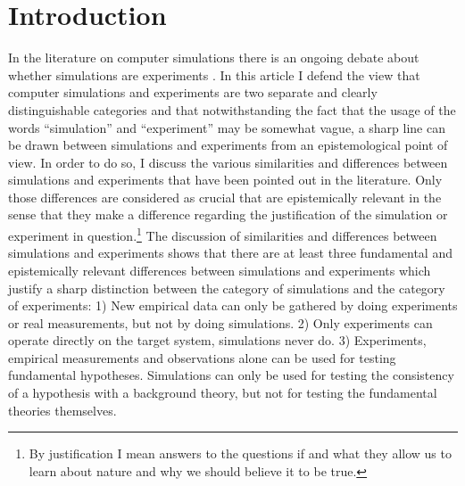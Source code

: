 \documentclass[onecollarge]{STJour}
\numberwithin{equation}{section}
\begin{document}
\tableofcontents

\onehalfspacing

\section{Introduction}



In the literature on computer simulations there is an ongoing debate about whether simulations are experiments \citep{winsberg:2009, morrison:2009}. In this article I defend the view that computer simulations and experiments are two separate and clearly distinguishable categories and that notwithstanding the fact that the usage of the words ``simulation'' and ``experiment'' may be somewhat vague, a sharp line can be drawn between simulations and experiments from an epistemological point of view. In order to do so, I discuss the various similarities and differences between simulations and experiments that have been pointed out in the literature. Only those differences are considered as crucial that are epistemically relevant in the sense that they make a difference regarding the justification of the simulation or experiment in question.\footnote{By justification I mean answers to the questions if and what they allow us to learn about nature and why we should believe it to be true.} The discussion of similarities and differences between simulations and experiments shows that there are at least three fundamental and epistemically relevant differences between simulations and experiments which justify a sharp distinction between the category of simulations and the category of experiments: 1) New empirical data can only be gathered by doing experiments or real measurements, but not by doing simulations. 2) Only experiments can operate directly on the target system, simulations never do. 3) Experiments, empirical measurements and observations alone can be used for testing fundamental hypotheses. Simulations can only be used for testing the consistency of a hypothesis with a background theory, but not for testing the fundamental theories themselves. 
\end{document}

